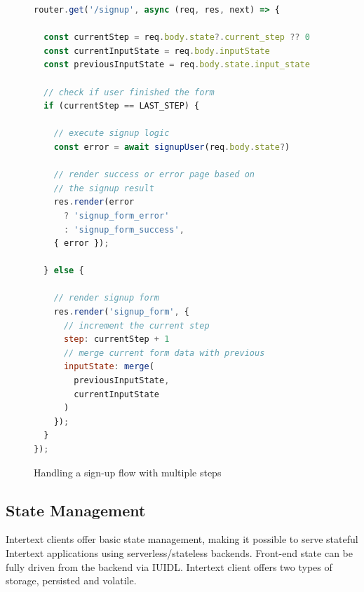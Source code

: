 \begin{figure}
\begin{minipage}{\linewidth}
\begin{lstlisting}[language=javascript]
router.get('/signup', async (req, res, next) => {
  
  const currentStep = req.body.state?.current_step ?? 0
  const currentInputState = req.body.inputState
  const previousInputState = req.body.state.input_state
  
  // check if user finished the form
  if (currentStep == LAST_STEP) {
    
    // execute signup logic
    const error = await signupUser(req.body.state?)
    
    // render success or error page based on
    // the signup result
    res.render(error
      ? 'signup_form_error'
      : 'signup_form_success',
    { error });
  
  } else {
    
    // render signup form
    res.render('signup_form', {
      // increment the current step
      step: currentStep + 1
      // merge current form data with previous
      inputState: merge(
        previousInputState,
        currentInputState
      )
    });
  }
});
\end{lstlisting}
\end{minipage}
\caption{Handling a sign-up flow with multiple steps}%
\label{fig:state_signup_progress_js}%
\end{figure}

\subsection{State Management}

Intertext clients offer basic state management, making it possible to serve stateful Intertext applications using serverless/stateless backends. Front-end state can be fully driven from the backend via IUIDL. Intertext client offers two types of storage, persisted and volatile. 

